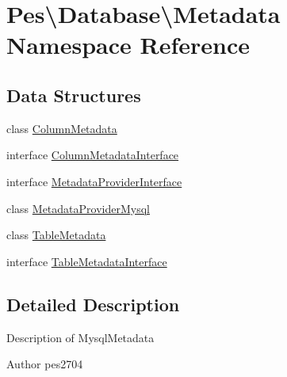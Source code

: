 \hypertarget{namespace_pes_1_1_database_1_1_metadata}{}\section{Pes\textbackslash{}Database\textbackslash{}Metadata Namespace Reference}
\label{namespace_pes_1_1_database_1_1_metadata}
\subsection*{Data Structures}
\begin{DoxyCompactItemize}
\item 
class \mbox{\hyperlink{class_pes_1_1_database_1_1_metadata_1_1_column_metadata}{Column\+Metadata}}
\item 
interface \mbox{\hyperlink{interface_pes_1_1_database_1_1_metadata_1_1_column_metadata_interface}{Column\+Metadata\+Interface}}
\item 
interface \mbox{\hyperlink{interface_pes_1_1_database_1_1_metadata_1_1_metadata_provider_interface}{Metadata\+Provider\+Interface}}
\item 
class \mbox{\hyperlink{class_pes_1_1_database_1_1_metadata_1_1_metadata_provider_mysql}{Metadata\+Provider\+Mysql}}
\item 
class \mbox{\hyperlink{class_pes_1_1_database_1_1_metadata_1_1_table_metadata}{Table\+Metadata}}
\item 
interface \mbox{\hyperlink{interface_pes_1_1_database_1_1_metadata_1_1_table_metadata_interface}{Table\+Metadata\+Interface}}
\end{DoxyCompactItemize}


\subsection{Detailed Description}
Description of Mysql\+Metadata

\begin{DoxyAuthor}{Author}
pes2704 
\end{DoxyAuthor}
